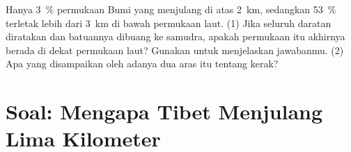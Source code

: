 \begin{exercise}[$\star\star\star$]\label{exo:g11:lithosphere-asthenosphere:15}
Hanya \qty{3}{\percent} permukaan Bumi yang menjulang di atas \qty{2}{km},
sedangkan \qty{53}{\percent} terletak lebih dari \qty{3}{km} di bawah permukaan
laut. (1) Jika seluruh daratan diratakan dan batuannya dibuang ke samudra,
apakah permukaan itu akhirnya berada di dekat permukaan laut? Gunakan 
untuk menjelaskan jawabanmu. (2) Apa yang disampaikan oleh adanya dua aras itu
tentang kerak?
\end{exercise}

\section{Soal: Mengapa Tibet Menjulang Lima Kilometer}


